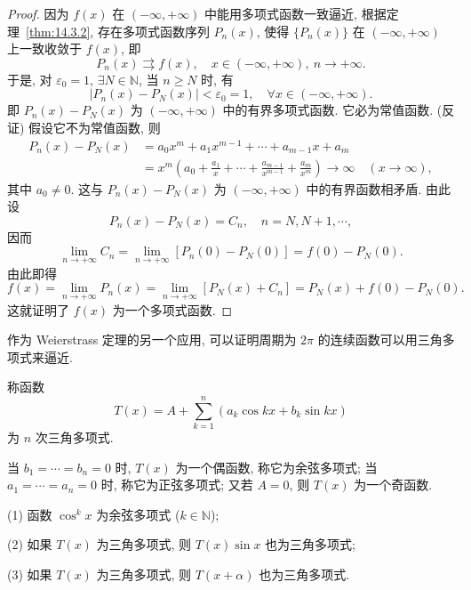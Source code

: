 \begin{proof}
因为 $f(x)$ 在 $(-\infty,+\infty)$ 中能用多项式函数一致逼近, 根据定理~\ref{thm:14.3.2}, 存在多项式函数序列 $P_{n}(x)$, 使得 $\{P_{n}(x)\}$ 在 $(-\infty,+\infty)$ 上一致收敛于 $f(x)$, 即
\[
  P_{n}(x)\rightrightarrows f(x),\quad x\in(-\infty,+\infty),\ n\to+\infty.
\]
于是, 对 $\varepsilon_{0}=1$, $\exists N\in\mathbb{N}$, 当 $n\geqslant N$ 时, 有
\[
  |P_{n}(x)-P_{N}(x)|<\varepsilon_{0}=1,\quad\forall x\in(-\infty,+\infty).
\]
即 $P_{n}(x)-P_{N}(x)$ 为 $(-\infty,+\infty)$ 中的有界多项式函数. 它必为常值函数. (反证) 假设它不为常值函数, 则
\[
  \begin{aligned}
    P_{n}(x)-P_{N}(x)&=a_{0}x^{m}+a_{1}x^{m-1}+\cdots+a_{m-1}x+a_{m}\\
    &=x^{m}\left(a_{0}+\frac{a_{1}}{x}+\cdots+\frac{a_{m-1}}{x^{m-1}}+\frac{a_{m}}{x^{m}}\right)\to\infty\quad(x\to\infty),
  \end{aligned}
\]
其中 $a_{0}\neq0$. 这与 $P_{n}(x)-P_{N}(x)$ 为 $(-\infty,+\infty)$ 中的有界函数相矛盾. 由此设
\[
  P_{n}(x)-P_{N}(x)=C_{n},\quad n=N,N+1,\cdots,
\]
因而
\[
  \lim_{n\to+\infty}C_{n}=\lim_{n\to+\infty}[P_{n}(0)-P_{N}(0)]=f(0)-P_{N}(0).
\]
由此即得
\[
  f(x)=\lim_{n\to+\infty}P_{n}(x)=\lim_{n\to+\infty}[P_{N}(x)+C_{n}]=P_{N}(x)+f(0)-P_{N}(0).
\]
这就证明了 $f(x)$ 为一个多项式函数.
\end{proof}

作为 Weierstrass 定理的另一个应用, 可以证明周期为 $2\pi$ 的连续函数可以用三角多项式来逼近.

\begin{definition}\label{def:14.3.2}
称函数
\[
  T(x)=A+\sum_{k=1}^{n}(a_{k}\cos kx+b_{k}\sin kx)
\]
为 $n$ 次三角多项式.
\end{definition}

当 $b_{1}=\cdots=b_{n}=0$ 时, $T(x)$ 为一个偶函数, 称它为余弦多项式; 当 $a_{1}=\cdots=a_{n}=0$ 时, 称它为正弦多项式; 又若 $A=0$, 则 $T(x)$ 为一个奇函数.

\begin{lemma}\label{lem:14.3.2}
(1) 函数 $\cos^{k}x$ 为余弦多项式 ($k\in\mathbb{N}$);

(2) 如果 $T(x)$ 为三角多项式, 则 $T(x)\sin x$ 也为三角多项式;

(3) 如果 $T(x)$ 为三角多项式, 则 $T(x+\alpha)$ 也为三角多项式.
\end{lemma}

